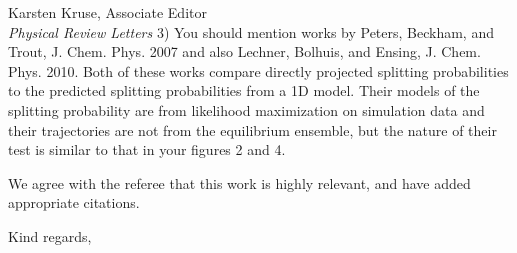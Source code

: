 \documentclass[ucb,qb3,10pt,fullfrom]{ucletter}
\begin{document}
\begin{letter}{Karsten Kruse, Associate Editor\\
\emph{Physical Review Letters}}
\color{magenta}
3) You should mention works by Peters, Beckham, and Trout, J. Chem.
Phys. 2007 and also Lechner, Bolhuis, and Ensing, J. Chem. Phys. 2010.
Both of these works compare directly projected splitting probabilities
to the predicted splitting probabilities from a 1D model. Their models
of the splitting probability are from likelihood maximization on
simulation data and their trajectories are not from the equilibrium
ensemble, but the nature of their test is similar to that in your
figures 2 and 4.

\color{black}
We agree with the referee that this work is highly relevant, and have added appropriate citations.

\closing{Kind regards,}
\end{letter}
\end{document}
